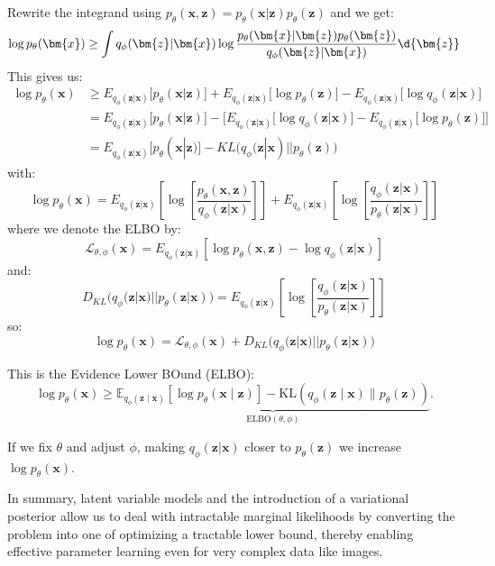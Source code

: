 \documentclass{article}
\begin{document}
\begin{remark}[Motivation]
Rewrite the integrand using $p_{\theta}(\bm{x}, \bm{z}) = p_{\theta}(\bm{x} | \bm{z}) p_{\theta}(\bm{z})$ and we get:
\[
\log p_{\theta}(\bm{x}) \geq \int q_{\phi}(\bm{z} | \bm{x}) \log \frac{p_{\theta}(\bm{x} | \bm{z}) p_{\theta}(\bm{z})}{q_{\phi}(\bm{z} | \bm{x})}  \d{\bm{z}}
\]
This gives us:
\begin{align*}
  \log p_{\theta}(\bm{x}) & \geq E_{q_{\phi}(\bm{z} | \bm{x})}\big[  p_{\theta}(\bm{x} | \bm{z}) \big]   + E_{q_{\phi}(\bm{z} | \bm{x})} \big[  \log p_{\theta}(\bm{z}) \big] - E_{q_{\phi}(\bm{z} | \bm{x})} \big[ \log q_{\phi}(\bm{z} | \bm{x}) \big] \\
  &= E_{q_{\phi}(\bm{z} | \bm{x})}\big[  p_{\theta}(\bm{x} | \bm{z}) \big]   -  \Big[ E_{q_{\phi}(\bm{z} | \bm{x})} \big[ \log q_{\phi}(\bm{z} | \bm{x}) \big]  - E_{q_{\phi}(\bm{z} | \bm{x})} \big[  \log p_{\theta}(\bm{z}) \big]   \Big]  \\
  &= E_{q_{\phi}(\bm{z} | \bm{x})}\big[  p_{\theta}(\bm{x} | \bm{z}) \big]  - KL \Big( q_{\phi}(\bm{z} | \bm{x})  || p_{\theta}(\bm{z}) \Big) 
\end{align*}
with:
\[
  \log p_{\theta}(\bm{x}) =  E_{q_{\phi}(\bm{z} | \bm{x})} \left[ \log \left[ \frac{p_{\theta}(\bm{x}, \bm{z})}{ q_{\phi}(\bm{z} | \bm{x})} \right] \right] + E_{q_{\phi}(\bm{z} | \bm{x})} \left[  \log \left[  \frac{q_{\phi}(\bm{z} | \bm{x})}{p_{\theta}(\bm{z} | \bm{x})} \right] \right]
\]
where we denote the ELBO by:
\[
  \mathcal{L}_{\theta, \phi}( \bm{x}) = E_{q_{\phi}(\bm{z} | \bm{x})} [\log p_{\theta}(\bm{x}, \bm{z}) - \log q_{\phi}(\bm{z} | \bm{x})] 
\]
and:
\[
  D_{KL} \big( q_{\phi}(\bm{z} | \bm{x}) || p_{\theta}(\bm{z} | \bm{x}) \big) = E_{q_{\phi}(\bm{z} | \bm{x})} \left[  \log \left[  \frac{q_{\phi}(\bm{z} | \bm{x})}{p_{\theta}(\bm{z} | \bm{x})} \right] \right]  
\]
so:
\[
  \log p_{\theta}(\bm{x}) = \mathcal{L}_{\theta, \phi}(\bm{x}) + D_{KL} \big( q_{\phi}(\bm{z} | \bm{x}) || p_{\theta}(\bm{z} | \bm{x}) \big) 
\]

This is the Evidence Lower BOund (ELBO):
\[
\log p_{\theta}(\mathbf{x}) \ge \underbrace{\mathbb{E}_{q_{\phi}(\mathbf{z}\mid\mathbf{x})}[\log p_{\theta}(\mathbf{x}\mid\mathbf{z})] - \text{KL}(q_{\phi}(\mathbf{z}\mid\mathbf{x})\|p_{\theta}(\mathbf{z}))}_{\text{ELBO}(\theta,\phi)}.
\]

If we fix $\theta$ and adjust $\phi$, making $q_{\phi}(\bm{z} | \bm{x})$ closer to $p_{\theta}(\bm{z})$ we increase $\log p_{\theta}(\bm{x})$.


In summary, latent variable models and the introduction of a variational posterior allow us to deal with intractable marginal likelihoods by converting the problem into one of optimizing a tractable lower bound, thereby enabling effective parameter learning even for very complex data like images.
\end{remark}
\end{document}
